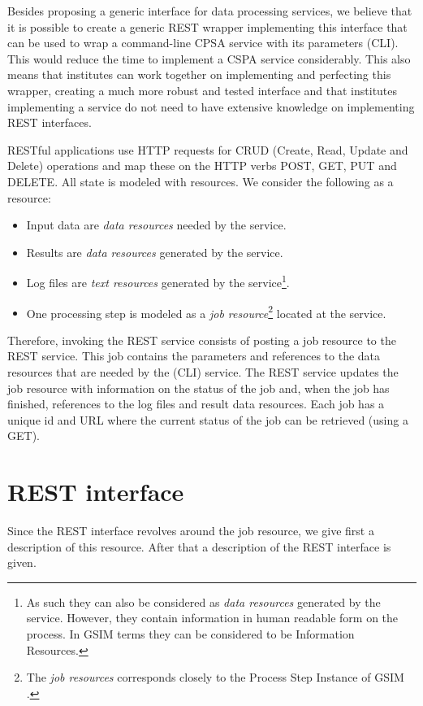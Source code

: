 \documentclass[a4paper]{article}
\begin{document}
Besides proposing a generic interface for data processing services, we believe
that it is possible to create a generic REST wrapper implementing this
interface that can be used to wrap a command-line CPSA service with its
parameters (CLI). This would reduce the time to implement a CSPA service
considerably.  This also means that institutes can work together on
implementing and perfecting this wrapper, creating a much more robust and
tested interface and that institutes implementing a service do not need to have
extensive knowledge on implementing REST interfaces. 

RESTful applications use HTTP requests for CRUD (Create, Read, Update and
Delete) operations and map these on the HTTP verbs POST, GET, PUT and DELETE.
All state is modeled with resources. We consider the following as a resource:

\begin{itemize}
  \item Input data are \emph{data resources} needed by the service.
  \item Results are \emph{data resources} generated by the service.
  \item Log files are \emph{text resources} generated by the service\footnote{As
  such they can also be considered as \emph{data resources} generated by the
  service. However, they contain information in human readable form on the
  process. In GSIM \citep{gsim2013} terms they can be considered to be
  Information Resources.}.
  \item One processing step is modeled as a \emph{job resource}\footnote{The
  \emph{job resources} corresponds closely to the Process Step Instance of GSIM
  \citep{gsim2013}.} located at the service.
\end{itemize}

Therefore, invoking the REST service consists of posting a job resource to the
REST service. This job contains the parameters and references to the data
resources that are needed by the (CLI) service.  The REST service updates the
job resource with information on the status of the job and, when the job has
finished, references to the log files and result data resources. Each job has a
unique id and URL where the current status of the job can be retrieved (using a
GET). 

\section{REST interface}
Since the REST interface revolves around the job resource, we give first a
description of this resource. After that a description of the REST interface is
given. 
\end{document}
